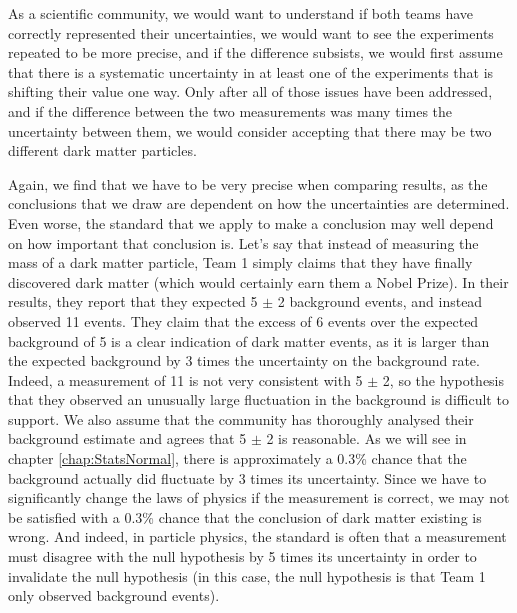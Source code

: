 As a scientific community, we would want to understand if both teams have correctly represented their uncertainties, we would want to see the experiments repeated to be more precise, and if the difference subsists, we would first assume that there is a systematic uncertainty in at least one of the experiments that is shifting their value one way. Only after all of those issues have been addressed, and if the difference between the two measurements was many times the uncertainty between them, we would consider accepting that there may be two different dark matter particles.

Again, we find that we have to be very precise when comparing results, as the conclusions that we draw are dependent on how the uncertainties are determined. Even worse, the standard that we apply to make a conclusion may well depend on how important that conclusion is. Let's say that instead of measuring the mass of a dark matter particle, Team 1 simply claims that they have finally discovered dark matter (which would certainly earn them a Nobel Prize). In their results, they report that they expected 5 $\pm$ 2 background events, and instead observed 11 events. They claim that the excess of 6 events over the expected background of 5 is a clear indication of dark matter events, as it is larger than the expected background by 3 times the uncertainty on the background rate. Indeed, a measurement of 11 is not very consistent with 5 $\pm$ 2, so the hypothesis that they observed an unusually large fluctuation in the background is difficult to support. We also assume that the community has thoroughly analysed their background estimate and agrees that 5 $\pm$ 2 is reasonable. As we will see in chapter \ref{chap:StatsNormal}, there is approximately a 0.3\% chance that the background actually did fluctuate by 3 times its uncertainty. Since we have to significantly change the laws of physics if the measurement is correct, we may not be satisfied with a 0.3\% chance that the conclusion of dark matter existing is wrong. And indeed, in particle physics, the standard is often that a measurement must disagree with the null hypothesis by 5 times its uncertainty in order to invalidate the null hypothesis (in this case, the null hypothesis is that Team 1 only observed background events).

